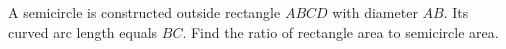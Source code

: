A semicircle is constructed outside rectangle $ABCD$ with diameter $AB$. Its curved arc length equals $BC$. Find the ratio of rectangle area to semicircle area.
